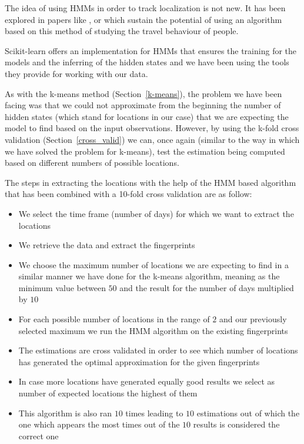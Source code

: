 The idea of using HMMs in order to track localization is not new. It has been
explored in papers like \cite{el2013indoor}, \cite{inatomi2013hidden} or
\cite{morelli2007hidden} which sustain the potential of using an algorithm based
on this method of studying the travel behaviour of people.

Scikit-learn \cite{SL} offers an implementation for HMMs that ensures the
training for the models and the inferring of the hidden states and we have been
using the tools they provide for working with our data.

As with the k-means method (Section~\ref{k-means}), the problem we have been
facing was that we could not approximate from the beginning the number of hidden
states (which stand for locations in our case) that we are expecting the model
to find based on the input observations. However, by using the k-fold cross
validation (Section~\ref{cross_valid}) we can, once again (similar to the way in
which we have solved the problem for k-means), test the estimation being
computed based on different numbers of possible locations.

The steps in extracting the locations with the help of the HMM based algorithm
that has been combined with a 10-fold cross validation are as follow:
\begin{itemize}
  \item We select the time frame (number of days) for which we want to extract
  the locations
  \item We retrieve the data and extract the fingerprints
  \item We choose the maximum number of locations we are expecting to find in a
  similar manner we have done for the k-means algorithm, meaning as the minimum
  value between $50$ and the result for the number of days multiplied by $10$
  \item For each possible number of locations in the range of $2$ and our
  previously selected maximum we run the HMM algorithm on the existing
  fingerprints
  \item The estimations are cross validated in order to see which number of
  locations has generated the optimal approximation for the given fingerprints
  \item In case more locations have generated equally good results we select
  as number of expected locations the highest of them
  \item This algorithm is also ran $10$ times leading to $10$ estimations out of
  which the one which appears the most times out of the $10$ results is
  considered the correct one
\end{itemize}

